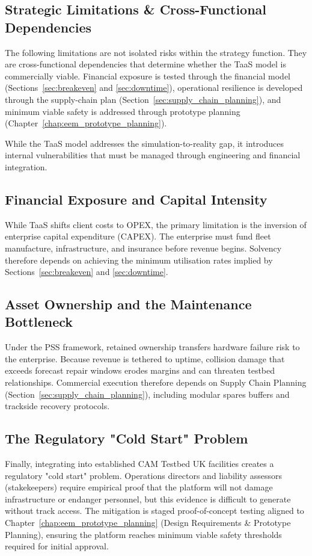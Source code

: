 \documentclass[11pt, a4paper]{report}
\numberwithin{equation}{section}
\begin{document}
\begin{refsection}
\section{Strategic Limitations \& Cross-Functional Dependencies}

The following limitations are not isolated risks within the strategy function. They are cross-functional dependencies that determine whether the TaaS model is commercially viable. Financial exposure is tested through the financial model (Sections~\ref{sec:breakeven} and \ref{sec:downtime}), operational resilience is developed through the supply-chain plan (Section~\ref{sec:supply_chain_planning}), and minimum viable safety is addressed through prototype planning (Chapter~\ref{chap:eem_prototype_planning}).

While the TaaS model addresses the simulation-to-reality gap, it introduces internal vulnerabilities that must be managed through engineering and financial integration.

\subsection{Financial Exposure and Capital Intensity}

While TaaS shifts client costs to OPEX, the primary limitation is the inversion of enterprise capital expenditure (CAPEX). The enterprise must fund fleet manufacture, infrastructure, and insurance before revenue begins. Solvency therefore depends on achieving the minimum utilisation rates implied by Sections~\ref{sec:breakeven} and \ref{sec:downtime}.

\subsection{Asset Ownership and the Maintenance Bottleneck}

Under the PSS framework, retained ownership transfers hardware failure risk to the enterprise. Because revenue is tethered to uptime, collision damage that exceeds forecast repair windows erodes margins and can threaten testbed relationships. Commercial execution therefore depends on Supply Chain Planning (Section~\ref{sec:supply_chain_planning}), including modular spares buffers and trackside recovery protocols.

\subsection{The Regulatory "Cold Start" Problem}
\label{sec:ch7-cold-start}
Finally, integrating into established CAM Testbed UK facilities creates a regulatory "cold start" problem. Operations directors and liability assessors (stakekeepers) require empirical proof that the platform will not damage infrastructure or endanger personnel, but this evidence is difficult to generate without track access. The mitigation is staged proof-of-concept testing aligned to Chapter~\ref{chap:eem_prototype_planning} (Design Requirements \& Prototype Planning), ensuring the platform reaches minimum viable safety thresholds required for initial approval.


\end{refsection}
\end{document}
